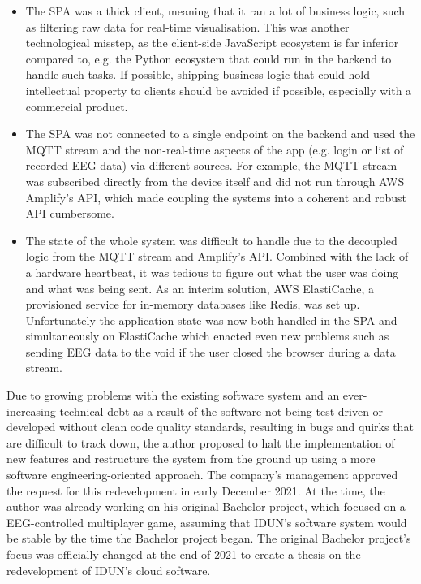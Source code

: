 \begin{itemize}
  \item The SPA was a thick client, meaning that it ran a lot of business logic, such as filtering raw data for real-time visualisation. This was another technological misstep, as the client-side JavaScript ecosystem is far inferior compared to, e.g. the Python ecosystem that could run in the backend to handle such tasks. If possible, shipping business logic that could hold intellectual property to clients should be avoided if possible, especially with a commercial product.
  \item The SPA was not connected to a single endpoint on the backend and used the MQTT stream and the non-real-time aspects of the app (e.g. login or list of recorded EEG data) via different sources. For example, the MQTT stream was subscribed directly from the device itself and did not run through AWS Amplify's API, which made coupling the systems into a coherent and robust API cumbersome.
  \item The state of the whole system was difficult to handle due to the decoupled logic from the MQTT stream and Amplify's API. Combined with the lack of a hardware heartbeat, it was tedious to figure out what the user was doing and what was being sent. As an interim solution, AWS ElastiCache, a provisioned service for in-memory databases like Redis, was set up. Unfortunately the application state was now both handled in the SPA and simultaneously on ElastiCache which enacted even new problems such as sending EEG data to the void if the user closed the browser during a data stream.
\end{itemize}

Due to growing problems with the existing software system and an ever-increasing technical debt as a result of the software not being test-driven or developed without clean code quality standards, resulting in bugs and quirks that are difficult to track down, the author proposed to halt the implementation of new features and restructure the system from the ground up using a more software engineering-oriented approach. The company's management approved the request for this redevelopment in early December 2021. At the time, the author was already working on his original Bachelor project, which focused on a EEG-controlled multiplayer game, assuming that IDUN's software system would be stable by the time the Bachelor project began. The original Bachelor project's focus was officially changed at the end of 2021 to create a thesis on the redevelopment of IDUN's cloud software.

